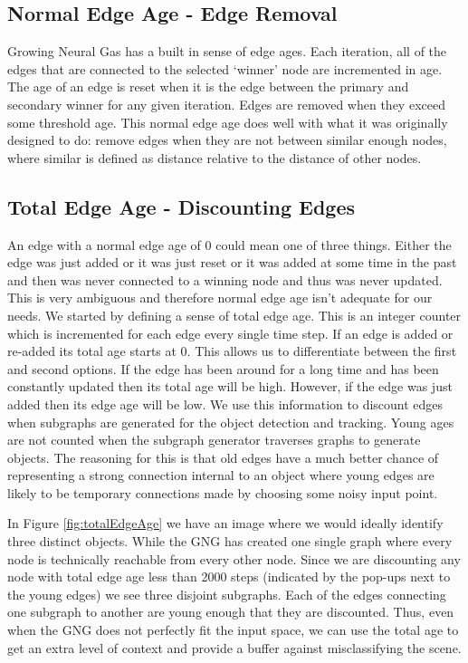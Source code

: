 \documentclass{article}
\renewcommand{\|}{\origbar} %
\begin{document}
\subsection{Normal Edge Age - Edge Removal}

Growing Neural Gas has a built in sense of edge ages. Each iteration, all of the edges that are connected to the selected `winner' node are incremented in age. The age of an edge is reset when it is the edge between the primary and secondary winner for any given iteration. Edges are removed when they exceed some threshold age. This normal edge age does well with what it was originally designed to do: remove edges when they are not between similar enough nodes, where similar is defined as distance relative to the distance of other nodes.

\subsection{Total Edge Age - Discounting Edges}

An edge with a normal edge age of 0 could mean one of three things. Either the edge was just added or it was just reset or it was added at some time in the past and then was never connected to a winning node and thus was never updated. This is very ambiguous and therefore normal edge age isn't adequate for our needs. We started by defining a sense of total edge age. This is an integer counter which is incremented for each edge every single time step. If an edge is added or re-added its total age starts at 0. This allows us to differentiate between the first and second options. If the edge has been around for a long time and has been constantly updated then its total age will be high. However, if the edge was just added then its edge age will be low. We use this information to discount edges when subgraphs are generated for the object detection and tracking. Young ages are not counted when the subgraph generator traverses graphs to generate objects. The reasoning for this is that old edges have a much better chance of representing a strong connection internal to an object where young edges are likely to be temporary connections made by choosing some noisy input point. 

In Figure \ref{fig:totalEdgeAge} we have an image where we would ideally identify three distinct objects. While the GNG has created one single graph where every node is technically reachable from every other node. Since we are discounting any node with total edge age less than 2000 steps (indicated by the pop-ups next to the young edges) we see three disjoint subgraphs. Each of the edges connecting one subgraph to another are young enough that they are discounted. Thus, even when the GNG does not perfectly fit the input space, we can use the total age to get an extra level of context and provide a buffer against misclassifying the scene.
\end{document}
